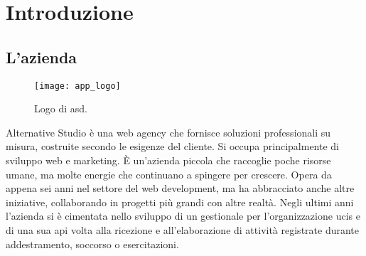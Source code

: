 
\chapter{Introduzione}
\label{cap:introduzione}



\section{L'azienda}

\begin{figure}[htbp]
	\begin{center}
		\texttt{[image: app\_logo]}
	\end{center}
	\caption {Logo di \acrlong{asd}.}
\end{figure}

Alternative Studio è una web agency che fornisce soluzioni professionali su misura, costruite secondo le esigenze del cliente. Si occupa
principalmente di sviluppo web e marketing. È un'azienda piccola che raccoglie poche risorse umane, ma molte energie che continuano a
spingere per crescere. Opera da appena sei anni nel settore del web development, ma ha abbracciato anche altre iniziative, collaborando in
progetti più grandi con altre realtà. Negli ultimi anni l'azienda si è cimentata nello sviluppo di un gestionale per l'organizzazione
\gls{ucis} e di una sua \acrshort{api} volta alla ricezione e all'elaborazione di attività registrate durante addestramento,
soccorso o esercitazioni.



